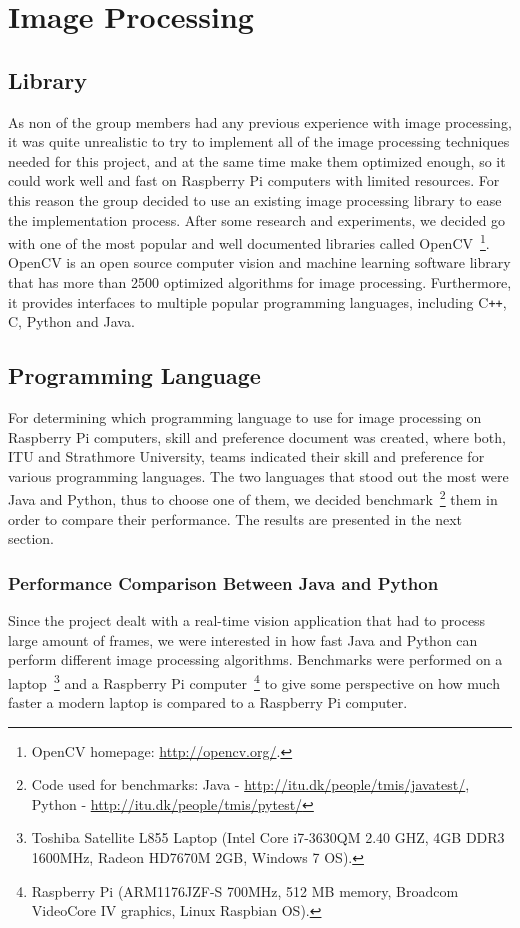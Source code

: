 \section{Image Processing}

\subsection{Library}
As non of the group members had any previous experience with image processing, it was quite unrealistic to try to implement all of the image processing techniques needed for this project, and at the same time make them optimized enough, so it could work well and fast on Raspberry Pi computers with limited resources. For this reason the group decided to use an existing image processing library to ease the implementation process. After some research and experiments, we decided go with one of the most popular and well documented libraries called OpenCV~\footnote{OpenCV homepage: \url{http://opencv.org/}.}. OpenCV is an open source computer vision and machine learning software library that has more than 2500 optimized algorithms for image processing. Furthermore, it provides interfaces to multiple popular programming languages, including C\texttt{++}, C, Python and Java.

\subsection{Programming Language}
For determining which programming language to use for image processing on Raspberry Pi computers, skill and preference document was created, where both, ITU and Strathmore University, teams indicated their skill and preference for various programming languages. The two languages that stood out the most were Java and Python, thus to choose one of them, we decided benchmark~\footnote{Code used for benchmarks: Java - \url{http://itu.dk/people/tmis/javatest/}, Python - \url{http://itu.dk/people/tmis/pytest/}} them in order to compare their performance. The results are presented in the next section.

\subsubsection{Performance Comparison Between Java and Python}
Since the project dealt with a real-time vision application that had to process large amount of frames, we were interested in how fast Java and Python can perform different image processing algorithms. Benchmarks were performed on a laptop~\footnote{Toshiba Satellite L855 Laptop (Intel Core i7-3630QM 2.40 GHZ, 4GB DDR3 1600MHz, Radeon HD7670M 2GB, Windows 7 OS).} and a Raspberry Pi computer~\footnote{Raspberry Pi (ARM1176JZF-S 700MHz, 512 MB memory, Broadcom VideoCore IV graphics, Linux Raspbian OS).} to give some perspective on how much faster a modern laptop is compared to a Raspberry Pi computer.

